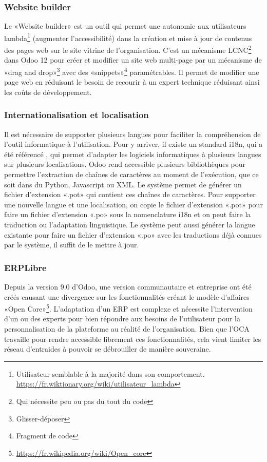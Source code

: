 \subsubsection{Website builder}

Le «Website builder» est un outil qui permet une autonomie aux utilisateurs lambda\footnote{Utilisateur semblable à la majorité dans son comportement. \url{https://fr.wiktionary.org/wiki/utilisateur_lambda}} (augmenter l'accessibilité) dans la création et mise à jour de contenus des pages web sur le site vitrine de l'organisation. C’est un mécanisme LCNC\footnote{Qui nécessite peu ou pas du tout du code} dans Odoo 12 pour créer et modifier un site web multi-page par un mécanisme de «drag and drop»\footnote{Glisser-déposer} avec des «snippets»\footnote{Fragment de code} paramétrables. Il permet de modifier une page web en réduisant le besoin de recourir à un expert technique réduisant ainsi les coûts de développement.

\subsubsection{Internationalisation et localisation}

Il est nécessaire de supporter plusieurs langues pour faciliter la compréhension de l'outil informatique à l'utilisation. Pour y arriver, il existe un standard i18n, qui a été référencé \cite{i18n_wiley}, qui permet d'adapter les logiciels informatiques à plusieurs langues sur plusieurs localisations\cite{wikipedia_i18n}. Odoo rend accessible plusieurs bibliothèques pour permettre l’extraction de chaînes de caractères au moment de l’exécution, que ce soit dans du Python, Javascript ou XML. Le système permet de générer un fichier d'extension «.pot» qui contient ces chaînes de caractères. Pour supporter une nouvelle langue et une localisation, on copie le fichier d'extension «.pot» pour faire un fichier d'extension «.po» sous la nomenclature i18n et on peut faire la traduction ou l’adaptation linguistique. Le système peut aussi générer la langue existante pour faire un fichier d'extension «.po» avec les traductions déjà connues par le système, il suffit de le mettre à jour.

\subsubsection{ERPLibre}

Depuis la version 9.0 d'Odoo, une version communautaire et entreprise ont été créés causant une divergence sur les fonctionnalités créant le modèle d'affaires «Open Core»\footnote{\url{https://fr.wikipedia.org/wiki/Open_core}}. L'adaptation d'un ERP est complexe et nécessite l'intervention d'un ou des experts pour bien répondre aux besoins de l'utilisateur pour la personnalisation de la plateforme au réalité de l'organisation. Bien que l'OCA travaille pour rendre accessible librement ces fonctionnalités, cela vient limiter les réseau d'entraides à pouvoir se débrouiller de manière souveraine.

